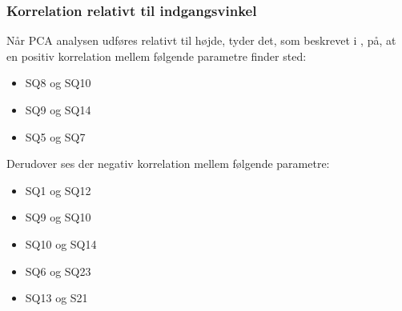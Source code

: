 \subsubsection{Korrelation relativt til indgangsvinkel}
Når PCA analysen udføres relativt til højde, tyder det, som beskrevet i , på, at en positiv korrelation mellem følgende parametre finder sted:
\begin{itemize}
	\item SQ8 og SQ10
	\item SQ9 og SQ14
	\item SQ5 og SQ7
\end{itemize}
%
Derudover ses der negativ korrelation mellem følgende parametre:
\begin{itemize}
	\item SQ1 og SQ12
	\item SQ9 og SQ10
	\item SQ10 og SQ14
	\item SQ6 og SQ23
	\item SQ13 og S21
\end{itemize}